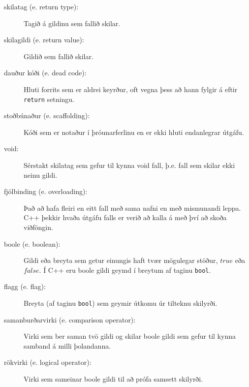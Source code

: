 \begin{description}

\item[skilatag (e. return type):]  Tagið á gildinu sem fallið skilar. 

\item[skilagildi (e. return value):]  Gildið sem fallið skilar.

\item[dauður kóði (e. dead code):]  Hluti forrits sem er aldrei keyrður, oft vegna þess að hann fylgir á eftir {\tt return} setningu.
\item[stoðbúnaður (e. scaffolding):]  Kóði sem er notaður í þróunarferlinu en er ekki hluti endanlegrar útgáfu.

\item[void:]  Sérstakt skilatag sem gefur til kynna void fall, þ.e. fall sem skilar ekki neinu gildi.

\item[fjölbinding (e. overloading):]  Það að hafa fleiri en eitt fall með sama nafni en með mismunandi leppa.  C++ þekkir hvaða útgáfu falls er verið að kalla á með því að skoða viðföngin.

\item[boole (e. boolean):]  Gildi eða breyta sem getur einungis haft tvær mögulegar stöður, $true$ eða $false$.
Í C++ eru boole gildi geymd í breytum af taginu {\tt bool}.

\item[flagg (e. flag):] Breyta (af taginu {\tt bool}) sem geymir útkomu úr tilteknu skilyrði.

\item[samanburðarvirki (e. comparison operator):]  Virki sem ber saman tvö gildi og skilar boole gildi sem gefur til kynna samband á milli þolandanna.

\item[rökvirki (e. logical operator):]  Virki sem sameinar boole gildi til að prófa samsett skilyrði.


\end{description}

